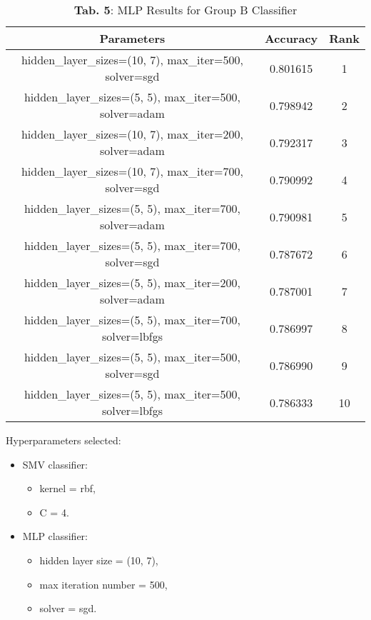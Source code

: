 \documentclass{article}
\begin{document}
\begin{table}[h!]
\centering
\begin{tabular}{|c|c|c|}
\hline
\textbf{Parameters}                                & \textbf{Accuracy} & \textbf{Rank} \\ \hline
hidden\_layer\_sizes=(10, 7), max\_iter=500, solver=sgd   & 0.801615          & 1             \\ \hline
hidden\_layer\_sizes=(5, 5), max\_iter=500, solver=adam  & 0.798942          & 2             \\ \hline
hidden\_layer\_sizes=(10, 7), max\_iter=200, solver=adam & 0.792317          & 3             \\ \hline
hidden\_layer\_sizes=(10, 7), max\_iter=700, solver=sgd  & 0.790992          & 4             \\ \hline
hidden\_layer\_sizes=(5, 5), max\_iter=700, solver=adam  & 0.790981          & 5             \\ \hline
hidden\_layer\_sizes=(5, 5), max\_iter=700, solver=sgd   & 0.787672          & 6             \\ \hline
hidden\_layer\_sizes=(5, 5), max\_iter=200, solver=adam  & 0.787001          & 7             \\ \hline
hidden\_layer\_sizes=(5, 5), max\_iter=700, solver=lbfgs & 0.786997          & 8             \\ \hline
hidden\_layer\_sizes=(5, 5), max\_iter=500, solver=sgd   & 0.786990          & 9             \\ \hline
hidden\_layer\_sizes=(5, 5), max\_iter=500, solver=lbfgs & 0.786333          & 10            \\ \hline
\end{tabular}
\caption{\textbf{Tab. 5}: MLP Results for Group B Classifier}

\label{tab:mlp_personality}
\end{table}

\vspace{1cm}

Hyperparameters selected:

\begin{itemize}
    \item SMV classifier:
    \begin{itemize}
        \item kernel = rbf,
        \item C = 4.
    \end{itemize}
    \item MLP classifier:
    \begin{itemize}
        \item hidden layer size = (10, 7),
        \item max iteration number = 500,
        \item solver = sgd.
    \end{itemize}
\end{itemize}
\end{document}
